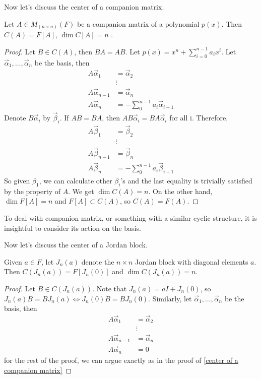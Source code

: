Now let's discuss the center of a companion matrix.
\begin{theorem}
\label{center of a companion matrix}
Let $A\in M_{(n\times n)}(F)$ be a companion matrix of a polynomial $p(x)$. Then $C(A)=F[A]$, $\dim C[A]=n$ .
\end{theorem}
\begin{proof}
Let $B\in C(A) $, then $BA=AB$. Let $p(x)=x^n+\sum_{i=0}^{n-1}a_ix^i$. Let $\vec{\alpha}_1,\dots,\vec{\alpha}_n$ be the basis, then 
\begin{align*}
    A\vec{\alpha}_1&=\vec{\alpha}_2\\
    &\vdots\\
    A\vec{\alpha}_{n-1}&=\vec{\alpha}_n\\
    A\vec{\alpha}_n&=-\sum_0^{n-1}a_{i}\vec{\alpha}_{i+1}
\end{align*}
Denote $B\vec{\alpha}_i$ by $\vec{\beta}_i$. If $AB=BA$, then $AB\vec{\alpha}_i=BA\vec{\alpha}_i$ for all i. Therefore, 
\begin{align*}
    A\vec{\beta}_1&=\vec{\beta}_2\\
    &\vdots\\
    A\vec{\beta}_{n-1}&=\vec{\beta}_n\\
    A\vec{\beta}_n&=-\sum_0^{n-1}a_{i}\vec{\beta}_{i+1}
\end{align*}
So given $\beta_1$, we can calculate other $\beta_i$'s and the last equality is trivially satisfied by the property of $A$. We get $\dim C(A)=n$. On the other hand, $\dim F[A]=n$ and $F[A]\subset C(A)$, so $C(A)=F(A)$.
\end{proof}
\begin{remark}
To deal with companion matrix, or something with a similar cyclic structure, it is insightful to consider its action on the basis.
\end{remark}

Now let's discuss the center of a Jordan block.
\begin{theorem}
\label{center of a Jordan block}
Given $a\in F$, let $J_n(a)$ denote the $n\times n$ Jordan block with diagonal elements $a$. Then $C(J_n(a))=F[J_n(0)]$ and $\dim C(J_n(a))=n$.
\end{theorem}
\begin{proof}
Let $B\in C(J_n(a))$. Note that $J_n(a)=aI+J_n(0)$, so $J_n(a)B=BJ_n(a)\Longleftrightarrow J_n(0)B=BJ_n(0)$. Similarly, let $\vec{\alpha}_1,\dots,\vec{\alpha}_n$ be the basis, then
\begin{align*}
    A\vec{\alpha}_1&=\vec{\alpha}_2\\
    &\vdots\\
    A\vec{\alpha}_{n-1}&=\vec{\alpha}_n\\
    A\vec{\alpha}_n&=0
\end{align*}
for the rest of the proof, we can argue exactly as in the proof of \ref{center of a companion matrix}
\end{proof}

